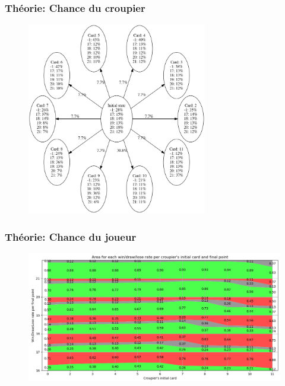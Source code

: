 \documentclass{beamer}
\begin{document}
\begin{frame}
    \frametitle{Théorie: Chance du croupier}
    \begin{figure}[H]
        \begin{center}
            \includegraphics[width=0.7\textwidth]{theoretical_croupier}
        \end{center}
    \end{figure}
\end{frame}

\begin{frame}
    \frametitle{Théorie: Chance du joueur}
    \begin{figure}[H]
        \begin{center}
            \includegraphics[width=1\textwidth]{theoretical_graph1}
        \end{center}
    \end{figure}
\end{frame}
\end{document}
